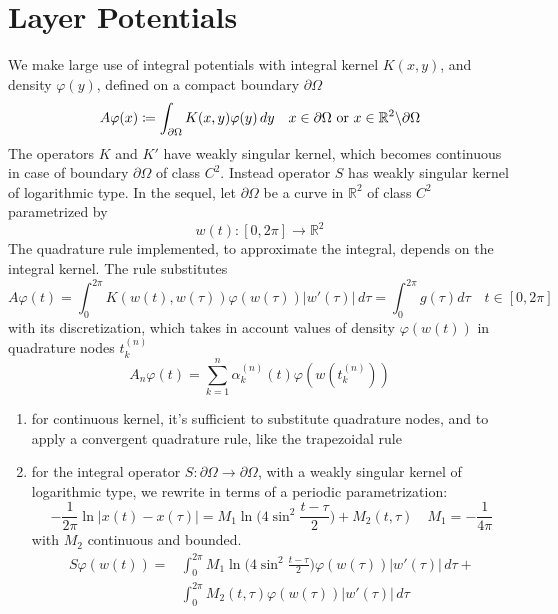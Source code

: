 \documentclass[10pt, a4paper, twoside, openright]{book}
\theoremstyle{definition}
\theoremstyle{plain}
\theoremstyle{plain}
\theoremstyle{plain}
\theoremstyle{plain}
\theoremstyle{plain}
\theoremstyle{plain}
\theoremstyle{plain}
\theoremstyle{plain}
\let\phi\varphi
\begin{document}
\section{Layer Potentials}
We make large use of integral potentials with integral kernel $K(x,y)$, and density $\phi(y)$, defined on a compact boundary $\partial \Omega$
\begin{equation}
 A\phi(x)\coloneqq \int_{\partial \Omega} K(x,y)\phi(y)\,dy \quad x\in \partial \Omega \textup{ or }x\in\mathbb{R}^2\backslash\partial\Omega
\end{equation}
The operators $K$ and $K'$ have weakly singular kernel, which becomes continuous in case of boundary $\partial \Omega$ of class $C^2$. Instead operator $S$ has weakly singular kernel of logarithmic type.
In the sequel, let $\partial\Omega$ be a curve in $\mathbb{R}^2$ of class $C^2$ parametrized by
\begin{equation}
w(t):[0,2\pi]\to\mathbb{R}^2
\end{equation}
The quadrature rule implemented, to approximate the integral, depends on the integral kernel. The rule substitutes 
\begin{equation}
 A\phi(t)=\int_0^{2\pi} K(w(t),w(\tau))\phi(w(\tau))|w'(\tau)|\,d\tau=\int_0^{2\pi}g(\tau)d\tau \quad t\in[0,2\pi]
\end{equation}
with its discretization, which takes in account values of density $\phi(w(t))$ in quadrature nodes $t_k^{(n)}$
\begin{equation}
 A_n\phi(t) = \sum_{k=1}^n\alpha_k^{(n)}(t)\phi(w(t_k^{(n)}))
\end{equation}
\begin{enumerate}
 \item for continuous kernel, it's sufficient to substitute quadrature nodes, and to apply a convergent quadrature rule, like the trapezoidal rule
 \item for the integral operator $S:\partial\Omega\to \partial\Omega$, with a weakly singular kernel of logarithmic type, we rewrite in terms of a periodic parametrization:
\begin{equation}
 -\frac{1}{2\pi}\ln|x(t)-x(\tau)|=M_1\ln\Big(4\sin^2\frac{t-\tau}{2}\Big)+M_2(t,\tau) \quad M_1 = -\frac{1}{4\pi}
\end{equation}
with $M_2$ continuous and bounded.
\begin{align}
 S\phi(w(t)) =  &\int_0^{2\pi} M_1\ln\Big(4\sin^2\frac{t-\tau}{2}\Big)\phi(w(\tau))|w'(\tau)|\,d\tau + \\ 
                &\int_0^{2\pi} M_2(t,\tau)\phi(w(\tau))|w'(\tau)|\,d\tau 
\end{align}

\end{enumerate}
\end{document}
